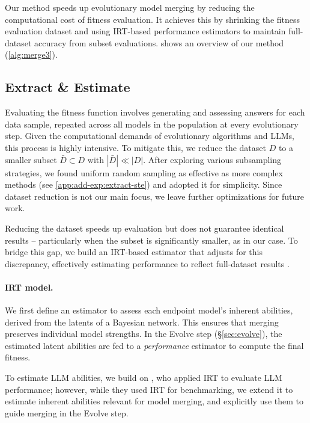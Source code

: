 Our method \approach speeds up evolutionary model merging by reducing the computational cost of fitness evaluation. It achieves this by shrinking the fitness evaluation dataset and using IRT-based performance estimators to maintain full-dataset accuracy from subset evaluations.  shows an overview of our method (\cref{alg:merge3}).

\subsection{Extract \& Estimate} \label{sec: extract_and_estimate}
%
Evaluating the fitness function involves generating and assessing answers for each data sample, repeated across all models in the population at every evolutionary step. Given the computational demands of evolutionary algorithms and LLMs, this process is highly intensive. To mitigate this, we reduce the dataset $D$ to a smaller subset $\bar{D} \subset D$ with $|\bar{D}| \ll |D|$. After exploring various subsampling strategies, we found uniform random sampling as effective as more complex methods (see \cref{app:add-exp:extract-ste}) and adopted it for simplicity. Since dataset reduction is not our main focus, we leave further optimizations for future work.

Reducing the dataset speeds up evaluation but does not guarantee identical results -- particularly when the subset is significantly smaller, as in our case. To bridge this gap, we build an IRT-based estimator that adjusts for this discrepancy, effectively estimating performance to reflect full-dataset results \cite{lord1968statistical, tinybenchmarks}.

\label{sec:estimate}

\paragraph{IRT model.}\label{sec:irt}
%
We first define an {estimator} to assess each endpoint model's inherent abilities, derived from the latents of a Bayesian network. This ensures that merging preserves individual model strengths. In the Evolve step (\S \ref{sec:evolve}), the estimated latent abilities are fed to a {\em performance} estimator to compute the final fitness.

To estimate LLM abilities, we build on \citet{tinybenchmarks}, who applied IRT to evaluate LLM performance; however, while they used IRT for benchmarking, we extend it to estimate inherent abilities relevant for model merging, and explicitly use them to guide merging in the Evolve step.

